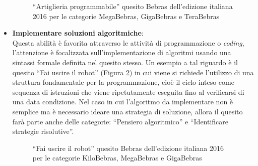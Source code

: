 \documentclass[12pt]{report}
\begin{document}
\begin{itemize}
	\begin{figure}[H]
		\centering
		\caption{``Artiglieria programmabile'' quesito Bebras dell'edizione italiana 2016 per le categorie MegaBebras, GigaBebras e TeraBebras}\label{artiglieria_programmabile}
	\end{figure}
	
	
\bigskip
	\item \textbf{Implementare soluzioni algoritmiche}: 
	\\
	Questa abilità è favorita attraverso le attività di programmazione o \textit{coding}, l'attenzione è focalizzata sull'implementazione di algoritmi usando una sintassi formale definita nel quesito stesso. 
	Un esempio a tal riguardo è il quesito ``Fai uscire il robot'' (Figura \ref{fig:uscire_robot}) in cui viene si richiede l'utilizzo di una struttura fondamentale per la programmazione, cioè il ciclo inteso come sequenza di istruzioni che viene ripetutamente eseguita fino al verificarsi di una data condizione.
	Nel caso in cui l'algoritmo da implementare non è semplice ma è necessario ideare una strategia di soluzione, allora il quesito farà parte anche delle categorie: ``Pensiero algoritmico'' e ``Identificare strategie risolutive''.
	
	\begin{figure}[h]
		\centering
		\caption{``Fai uscire il robot'' quesito Bebras dell'edizione italiana 2016 per le categorie KiloBebras, MegaBebras e GigaBebras} \label{fig:uscire_robot}
	\end{figure}
	

\end{itemize}
\end{document}

